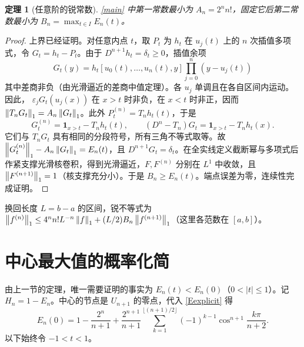 \documentclass[11pt,a4paper,fontset=fandol]{ctexart}
\newtheorem{theorem}{定理}\newtheorem{lemma}{引理}\newtheorem{proposition}{命题}
\begin{document}
\begin{theorem}[任意阶的锐常数]\label{thm:sharp}
\eqref{main} 中第一常数最小为 $A_n=2^nn!$，固定它后第二常数最小为 $B_n=\max_{t\in I}E_n(t)$。
\end{theorem}
\begin{proof}
上界已经证明。对任意内点 $t$，取 $P_t$ 为 $h_t$ 在 $u_j(t)$ 上的 $n$ 次插值多项式，令 $G_t=h_t-P_t$。由于 $D^{n+1}h_t=\delta_t\ge0$，插值余项
\[
 G_t(y)=h_t[u_0(t),\ldots,u_n(t),y]\prod_{j=0}^n(y-u_j(t))
\]
其中差商非负（由光滑逼近的差商中值定理）。各 $u_j$ 单调且在各自区间内运动。因此， $\varepsilon_jG_t(u_j(x))$ 在 $x>t$ 时非负，在 $x<t$ 时非正，因而 $\left\|T_nG_t\right\|_1=A_n\left\|G_t\right\|_1$。此外 $P_t^{(n)}=T_nh_t(t)$，于是
\[
 G_t^{(n)}=\mathbf1_{x>t}-T_nh_t(t),\qquad (D^n-T_n)G_t=\mathbf1_{x>t}-T_nh_t(x).
\]
它们与 $T_nG_t$ 具有相同的分段符号，所有三角不等式取等。故 $\left\|G_t^{(n)}\right\|_1-A_n\left\|G_t\right\|_1=E_n(t)$，且 $D^{n+1}G_t=\delta_t$。在全实线定义截断幂与多项式后作紧支撑光滑核卷积，得到光滑逼近，$F,F^{(n)}$ 分别在 $L^1$ 中收敛，且 $\left\|F^{(n+1)}\right\|_1=1$（核支撑充分小）。于是 $B_n\ge E_n(t)$。端点误差为零，连续性完成证明。
\end{proof}
换回长度 $L=b-a$ 的区间，锐不等式为 $\left\|f^{(n)}\right\|_1\le 4^nn!L^{-n}\left\|f\right\|_1+(L/2)B_n\left\|f^{(n+1)}\right\|_1$（这里各范数在 $[a,b]$）。


\section{中心最大值的概率化简}
由上一节的定理，唯一需要证明的事实为 $E_n(t)<E_n(0)$（$0<|t|\le1$）。记 $H_n=1-E_n$。中心的节点是 $U_{n+1}$ 的零点，代入 \eqref{Eexplicit} 得
\begin{equation}\label{center}
E_n(0)=1-\frac{2^n}{n+1}+\frac{2^{n+1}}{n+1}
\sum_{k=1}^{\lfloor(n+1)/2\rfloor}(-1)^{k-1}\cos^{n+1}\frac{k\pi}{n+2}.
\end{equation}
以下始终令 $-1<t<1$。
\end{document}
